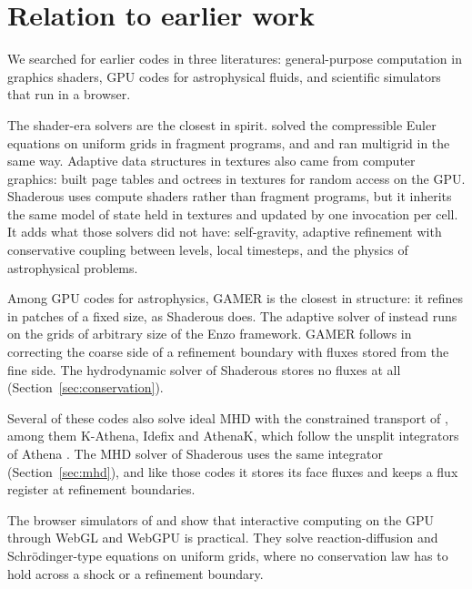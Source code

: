 \documentclass[twocolumn]{aastex701}
\begin{document}
\section{Relation to earlier work}
\label{sec:prior}

We searched for earlier codes in three literatures: general-purpose computation in graphics shaders, GPU codes for astrophysical fluids, and scientific simulators that run in a browser.

The shader-era solvers are the closest in spirit. \citet{Hagen2006} solved the compressible Euler equations on uniform grids in fragment programs, and \citet{Goodnight2003} and \citet{Bolz2003} ran multigrid in the same way. Adaptive data structures in textures also came from computer graphics: \citet{Lefohn2006} built page tables and octrees in textures for random access on the GPU. Shaderous uses compute shaders rather than fragment programs, but it inherits the same model of state held in textures and updated by one invocation per cell. It adds what those solvers did not have: self-gravity, adaptive refinement with conservative coupling between levels, local timesteps, and the physics of astrophysical problems.

Among GPU codes for astrophysics, GAMER \citep{Schive2010, Schive2018} is the closest in structure: it refines in patches of a fixed size, as Shaderous does. The adaptive solver of \citet{Wang2010} instead runs on the grids of arbitrary size of the Enzo framework. GAMER follows \citet{Berger1989} in correcting the coarse side of a refinement boundary with fluxes stored from the fine side. The hydrodynamic solver of Shaderous stores no fluxes at all (Section~\ref{sec:conservation}).

Several of these codes also solve ideal MHD with the constrained transport of \citet{Evans1988}, among them K-Athena, Idefix and AthenaK, which follow the unsplit integrators of Athena \citep{GardinerStone2005, Stone2008, StoneGardiner2009}. The MHD solver of Shaderous uses the same integrator (Section~\ref{sec:mhd}), and like those codes it stores its face fluxes and keeps a flux register at refinement boundaries.

The browser simulators of \citet{Kaboudian2019} and \citet{Baggaley2026} show that interactive computing on the GPU through WebGL and WebGPU is practical. They solve reaction-diffusion and Schr\"odinger-type equations on uniform grids, where no conservation law has to hold across a shock or a refinement boundary.
\end{document}
